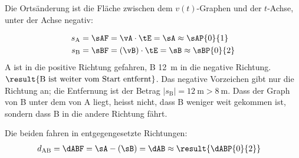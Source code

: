 Die Ortsänderung ist die Fläche zwischen dem $v(t)$-Graphen und der $t$-Achse, unter der Achse negativ:
\begin{center}
\end{center}
\begin{abcliste}
\abc
\begin{align}
 s_\mathrm{A} &= \sAF = \vA\cdot\tE = \sA \approx \sAP{0}{1} \\
 s_\mathrm{B} &= \sBF = \left(\vB\right)\cdot\tE = \sB \approx \sBP{0}{2}
\end{align}
A ist  in die positive Richtung gefahren, B \SI{12}{\meter} in die negative Richtung. $\result{\text{B ist weiter vom Start entfernt}}$. Das negative Vorzeichen gibt nur die Richtung an; die Entfernung ist der Betrag $|s_\mathrm{B}| = \SI{12}{\meter} > \SI{8}{\meter}$. Dass der Graph von B unter dem von A liegt, heisst nicht, dass B weniger weit gekommen ist, sondern dass B in die andere Richtung fährt.

\abc Die beiden fahren in entgegengesetzte Richtungen:
\begin{align}
 d_\mathrm{AB} &= \dABF = \sA-\left(\sB\right) = \dAB \approx \result{\dABP{0}{2}}
\end{align}
\end{abcliste}
